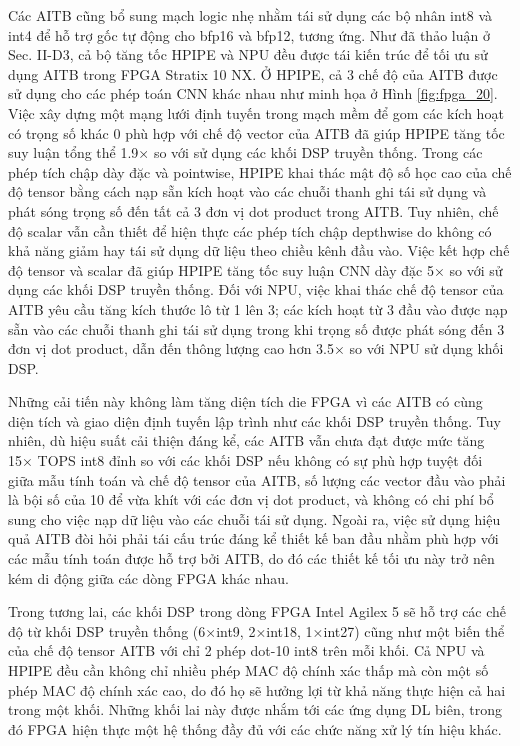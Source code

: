 \documentclass[a4paper]{article}
\begin{document}
Các AITB cũng bổ sung mạch logic nhẹ nhằm tái sử dụng các bộ nhân int8 và int4 để hỗ trợ gốc tự động cho bfp16 và bfp12, tương ứng. Như đã thảo luận ở Sec. II-D3, cả bộ tăng tốc HPIPE và NPU đều được tái kiến trúc để tối ưu sử dụng AITB trong FPGA Stratix 10 NX. Ở HPIPE, cả 3 chế độ của AITB được sử dụng cho các phép toán CNN khác nhau như minh họa ở Hình \ref{fig:fpga_20}. Việc xây dựng một mạng lưới định tuyến trong mạch mềm để gom các kích hoạt có trọng số khác 0 phù hợp với chế độ vector của AITB đã giúp HPIPE tăng tốc suy luận tổng thể 1.9× so với sử dụng các khối DSP truyền thống. Trong các phép tích chập dày đặc và pointwise, HPIPE khai thác mật độ số học cao của chế độ tensor bằng cách nạp sẵn kích hoạt vào các chuỗi thanh ghi tái sử dụng và phát sóng trọng số đến tất cả 3 đơn vị dot product trong AITB. Tuy nhiên, chế độ scalar vẫn cần thiết để hiện thực các phép tích chập depthwise do không có khả năng giảm hay tái sử dụng dữ liệu theo chiều kênh đầu vào. Việc kết hợp chế độ tensor và scalar đã giúp HPIPE tăng tốc suy luận CNN dày đặc 5× so với sử dụng các khối DSP truyền thống. Đối với NPU, việc khai thác chế độ tensor của AITB yêu cầu tăng kích thước lô từ 1 lên 3; các kích hoạt từ 3 đầu vào được nạp sẵn vào các chuỗi thanh ghi tái sử dụng trong khi trọng số được phát sóng đến 3 đơn vị dot product, dẫn đến thông lượng cao hơn 3.5× so với NPU sử dụng khối DSP.

Những cải tiến này không làm tăng diện tích die FPGA vì các AITB có cùng diện tích và giao diện định tuyến lập trình như các khối DSP truyền thống. Tuy nhiên, dù hiệu suất cải thiện đáng kể, các AITB vẫn chưa đạt được mức tăng 15× TOPS int8 đỉnh so với các khối DSP nếu không có sự phù hợp tuyệt đối giữa mẫu tính toán và chế độ tensor của AITB, số lượng các vector đầu vào phải là bội số của 10 để vừa khít với các đơn vị dot product, và không có chi phí bổ sung cho việc nạp dữ liệu vào các chuỗi tái sử dụng. Ngoài ra, việc sử dụng hiệu quả AITB đòi hỏi phải tái cấu trúc đáng kể thiết kế ban đầu nhằm phù hợp với các mẫu tính toán được hỗ trợ bởi AITB, do đó các thiết kế tối ưu này trở nên kém di động giữa các dòng FPGA khác nhau.

Trong tương lai, các khối DSP trong dòng FPGA Intel Agilex 5 sẽ hỗ trợ các chế độ từ khối DSP truyền thống (6×int9, 2×int18, 1×int27) cũng như một biến thể của chế độ tensor AITB với chỉ 2 phép dot-10 int8 trên mỗi khối. Cả NPU và HPIPE đều cần không chỉ nhiều phép MAC độ chính xác thấp mà còn một số phép MAC độ chính xác cao, do đó họ sẽ hưởng lợi từ khả năng thực hiện cả hai trong một khối. Những khối lai này được nhắm tới các ứng dụng DL biên, trong đó FPGA hiện thực một hệ thống đầy đủ với các chức năng xử lý tín hiệu khác.
\end{document}
